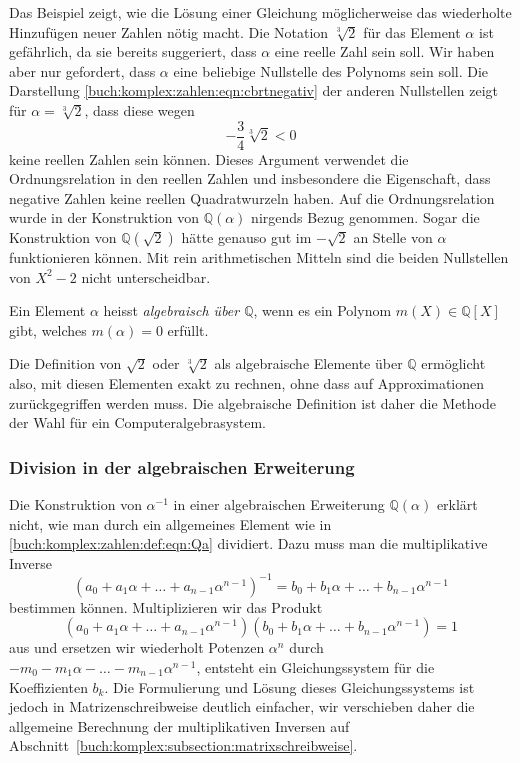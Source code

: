 Das Beispiel zeigt, wie die Lösung einer Gleichung möglicherweise
das wiederholte Hinzufügen neuer Zahlen nötig macht.
Die Notation $\sqrt[3]{2}$ für das Element $\alpha$ ist gefährlich,
da sie bereits suggeriert, dass $\alpha$ eine reelle Zahl sein
soll.
Wir haben aber nur gefordert, dass $\alpha$ eine beliebige
Nullstelle des Polynoms sein soll.
Die Darstellung \eqref{buch:komplex:zahlen:eqn:cbrtnegativ} der
anderen Nullstellen zeigt für $\alpha=\sqrt[3]{2}$, dass diese
wegen
\[
-\frac34 \!\sqrt[3]{2} < 0
\]
keine reellen Zahlen sein können.
Dieses Argument verwendet die Ordnungsrelation in den reellen
Zahlen und insbesondere die Eigenschaft, dass negative Zahlen
keine reellen Quadratwurzeln haben.
%
Auf die Ordnungsrelation wurde in der Konstruktion von
$\mathbb{Q}(\alpha)$ nirgends Bezug genommen.
Sogar die Konstruktion von $\mathbb{Q}(\!\sqrt{2})$ hätte genauso 
gut im $-\!\sqrt{2}$ an Stelle von $\alpha$ funktionieren können.
Mit rein arithmetischen Mitteln sind die beiden Nullstellen von
$X^2-2$ nicht unterscheidbar.

\begin{definition}
Ein Element $\alpha$ heisst \emph{algebraisch über $\mathbb{Q}$},
wenn es ein Polynom $m(X)\in\mathbb{Q}[X]$ gibt, welches $m(\alpha)=0$
erfüllt.
%
%
\end{definition}

Die Definition von $\!\sqrt{2}$ oder $\!\sqrt[3]{2}$ als
algebraische Elemente über $\mathbb{Q}$ ermöglicht also,
mit diesen Elementen exakt zu rechnen, ohne dass auf
Approximationen zurückgegriffen werden muss.
Die algebraische Definition ist daher die Methode der
Wahl für ein Computeralgebrasystem.

%
%
\subsubsection{Division in der algebraischen Erweiterung}
Die Konstruktion von $\alpha^{-1}$ in einer algebraischen Erweiterung
$\mathbb{Q}(\alpha)$ erklärt nicht, wie man durch ein allgemeines
Element wie in \eqref{buch:komplex:zahlen:def:eqn:Qa} dividiert.
Dazu muss man die multiplikative Inverse
\[
(a_0+a_1\alpha + \dots + a_{n-1}\alpha^{n-1})^{-1}
=
b_0+b_1\alpha + \dots + b_{n-1}\alpha^{n-1}
\]
bestimmen können.
Multiplizieren wir das Produkt
\[
(a_0+a_1\alpha + \dots + a_{n-1}\alpha^{n-1})
(b_0+b_1\alpha + \dots + b_{n-1}\alpha^{n-1})
=
1
\]
aus und ersetzen wir wiederholt Potenzen $\alpha^n$ durch
$-m_0-m_1\alpha-\dots-m_{n-1}\alpha^{n-1}$, entsteht ein
Gleichungssystem für die Koeffizienten $b_k$.
%
Die Formulierung und Lösung dieses Gleichungssystems ist jedoch
in Matrizenschreibweise deutlich einfacher, wir verschieben daher
die allgemeine Berechnung der multiplikativen Inversen auf
Abschnitt~\ref{buch:komplex:subsection:matrixschreibweise}.

